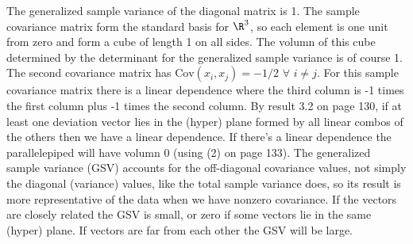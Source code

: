 \begin{enumerate}[label=(\alph*)]
    The generalized sample variance of the diagonal matrix is 1. The sample covariance matrix form the standard basis for $\R^3$, so each element is one unit from zero and form a cube of length 1 on all sides. The volumn of this cube determined by the determinant for the generalized sample variance is of course 1. The second covariance matrix has $\text{Cov}(x_i,x_j) = -1/2$ $\forall$ $i \ne j$. For this sample covariance matrix there is a linear dependence where the third column is -1 times the first column plus -1 times the second column. By result 3.2 on page 130, if at least one deviation vector lies in the (hyper) plane formed by all linear combos of the others then we have a linear dependence. If there's a linear dependence the parallelepiped will have volumn 0 (using (2) on page 133). The generalized sample variance (GSV) accounts for the off-diagonal covariance values, not simply the diagonal (variance) values, like the total sample variance does, so its result is more representative of the data when we have nonzero covariance. If the vectors are closely related the GSV is small, or zero if some vectors lie in the same (hyper) plane. If vectors are far from each other the GSV will be large.
\end{enumerate}